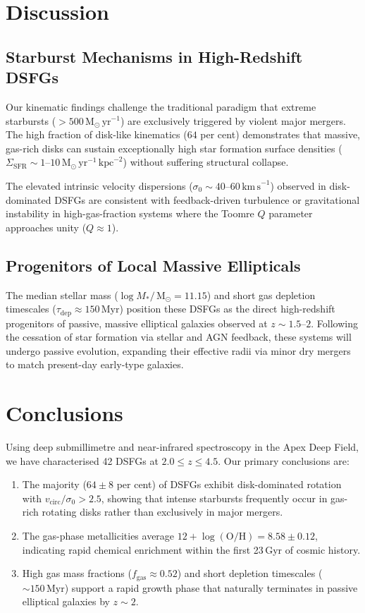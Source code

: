 \documentclass[fleqn,usenatbib]{mnras}
\newcommand{\kms}{\,\mathrm{km\,s}^{-1}}
\newcommand{\Msun}{\,\mathrm{M}_\odot}
\begin{document}
\section{Discussion}
\label{sec:discussion}

\subsection{Starburst Mechanisms in High-Redshift DSFGs}
Our kinematic findings challenge the traditional paradigm that extreme starbursts ($> 500\Msun\,\mathrm{yr}^{-1}$) are exclusively triggered by violent major mergers. The high fraction of disk-like kinematics ($64$ per cent) demonstrates that massive, gas-rich disks can sustain exceptionally high star formation surface densities ($\Sigma_{\mathrm{SFR}} \sim 1\text{--}10\Msun\,\mathrm{yr}^{-1}\,\mathrm{kpc}^{-2}$) without suffering structural collapse.

The elevated intrinsic velocity dispersions ($\sigma_0 \sim 40\text{--}60\kms$) observed in disk-dominated DSFGs are consistent with feedback-driven turbulence or gravitational instability in high-gas-fraction systems where the Toomre $Q$ parameter approaches unity ($Q \approx 1$).

\subsection{Progenitors of Local Massive Ellipticals}
The median stellar mass ($\log M_*/\Msun = 11.15$) and short gas depletion timescales ($\tau_{\mathrm{dep}} \approx 150\,\mathrm{Myr}$) position these DSFGs as the direct high-redshift progenitors of passive, massive elliptical galaxies observed at $z \sim 1.5\text{--}2$. Following the cessation of star formation via stellar and AGN feedback, these systems will undergo passive evolution, expanding their effective radii via minor dry mergers to match present-day early-type galaxies.

\section{Conclusions}
\label{sec:concl}

Using deep submillimetre and near-infrared spectroscopy in the Apex Deep Field, we have characterised 42 DSFGs at $2.0 \le z \le 4.5$. Our primary conclusions are:
\begin{enumerate}
\item The majority ($64 \pm 8$ per cent) of DSFGs exhibit disk-dominated rotation with $v_{\mathrm{circ}}/\sigma_0 > 2.5$, showing that intense starbursts frequently occur in gas-rich rotating disks rather than exclusively in major mergers.
\item The gas-phase metallicities average $12 + \log(\mathrm{O/H}) = 8.58 \pm 0.12$, indicating rapid chemical enrichment within the first 2\text{--}3\,Gyr of cosmic history.
\item High gas mass fractions ($f_{\mathrm{gas}} \approx 0.52$) and short depletion timescales ($\sim 150\,\mathrm{Myr}$) support a rapid growth phase that naturally terminates in passive elliptical galaxies by $z \sim 2$.
\end{enumerate}
\end{document}
